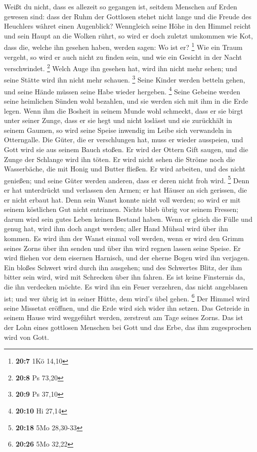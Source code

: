  Weißt du nicht, dass es allezeit so gegangen ist, seitdem
Menschen auf Erden gewesen sind:  dass der Ruhm der
Gottlosen stehet nicht lange und die Freude des Heuchlers währet einen
Augenblick?  Wenngleich seine Höhe in den Himmel reicht
und sein Haupt an die Wolken rührt,  so wird er doch
zuletzt umkommen wie Kot, dass die, welche ihn gesehen haben, werden
sagen: Wo ist er? \footnote{\textbf{20:7} 1Kö 14,10}  Wie
ein Traum vergeht, so wird er auch nicht zu finden sein, und wie ein
Gesicht in der Nacht verschwindet. \footnote{\textbf{20:8} Ps 73,20}
 Welch Auge ihn gesehen hat, wird ihn nicht mehr sehen;
und seine Stätte wird ihn nicht mehr schauen. \footnote{\textbf{20:9} Ps
  37,10}  Seine Kinder werden betteln gehen, und seine
Hände müssen seine Habe wieder hergeben. \footnote{\textbf{20:10} Hi
  27,14}  Seine Gebeine werden seine heimlichen Sünden
wohl bezahlen, und sie werden sich mit ihm in die Erde legen.
 Wenn ihm die Bosheit in seinem Munde wohl schmeckt, dass
er sie birgt unter seiner Zunge,  dass er sie hegt und
nicht loslässt und sie zurückhält in seinem Gaumen,  so
wird seine Speise inwendig im Leibe sich verwandeln in Otterngalle.
 Die Güter, die er verschlungen hat, muss er wieder
ausspeien, und Gott wird sie aus seinem Bauch stoßen.  Er
wird der Ottern Gift saugen, und die Zunge der Schlange wird ihn töten.
 Er wird nicht sehen die Ströme noch die Wasserbäche, die
mit Honig und Butter fließen.  Er wird arbeiten, und des
nicht genießen; und seine Güter werden anderen, dass er deren nicht froh
wird. \footnote{\textbf{20:18} 5Mo 28,30-33}  Denn er hat
unterdrückt und verlassen den Armen; er hat Häuser an sich gerissen, die
er nicht erbaut hat.  Denn sein Wanst konnte nicht voll
werden; so wird er mit seinem köstlichen Gut nicht entrinnen.
 Nichts blieb übrig vor seinem Fressen; darum wird sein
gutes Leben keinen Bestand haben.  Wenn er gleich die
Fülle und genug hat, wird ihm doch angst werden; aller Hand Mühsal wird
über ihn kommen.  Es wird ihm der Wanst einmal voll
werden, wenn er wird den Grimm seines Zorns über ihn senden und über ihn
wird regnen lassen seine Speise.  Er wird fliehen vor dem
eisernen Harnisch, und der eherne Bogen wird ihn verjagen.
 Ein bloßes Schwert wird durch ihn ausgehen; und des
Schwertes Blitz, der ihm bitter sein wird, wird mit Schrecken über ihn
fahren.  Es ist keine Finsternis da, die ihn verdecken
möchte. Es wird ihn ein Feuer verzehren, das nicht angeblasen ist; und
wer übrig ist in seiner Hütte, dem wird's übel gehen. \footnote{\textbf{20:26}
  5Mo 32,22}  Der Himmel wird seine Missetat eröffnen,
und die Erde wird sich wider ihn setzen.  Das Getreide in
seinem Hause wird weggeführt werden, zerstreut am Tage seines Zorns.
 Das ist der Lohn eines gottlosen Menschen bei Gott und
das Erbe, das ihm zugesprochen wird von Gott.

